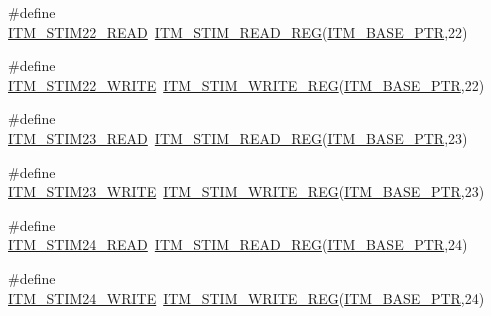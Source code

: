 \begin{DoxyCompactItemize}
\item 
\#define \hyperlink{group___i_t_m___register___accessor___macros_ga65cc639289ac0f598f937c573ed5abde}{I\+T\+M\+\_\+\+S\+T\+I\+M22\+\_\+\+R\+E\+AD}~\hyperlink{group___i_t_m___register___accessor___macros_ga5009882336aadcd4f37b45cf3395c450}{I\+T\+M\+\_\+\+S\+T\+I\+M\+\_\+\+R\+E\+A\+D\+\_\+\+R\+EG}(\hyperlink{group___i_t_m___peripheral_gafaddee8fe8b6a898d4e5edc43ee0d703}{I\+T\+M\+\_\+\+B\+A\+S\+E\+\_\+\+P\+TR},22)
\item 
\#define \hyperlink{group___i_t_m___register___accessor___macros_ga7733147e8939d83fbea163a3d3c181d4}{I\+T\+M\+\_\+\+S\+T\+I\+M22\+\_\+\+W\+R\+I\+TE}~\hyperlink{group___i_t_m___register___accessor___macros_ga049ca92a4e78e77c19af81e51aa73f1c}{I\+T\+M\+\_\+\+S\+T\+I\+M\+\_\+\+W\+R\+I\+T\+E\+\_\+\+R\+EG}(\hyperlink{group___i_t_m___peripheral_gafaddee8fe8b6a898d4e5edc43ee0d703}{I\+T\+M\+\_\+\+B\+A\+S\+E\+\_\+\+P\+TR},22)
\item 
\#define \hyperlink{group___i_t_m___register___accessor___macros_gaa2155b2b5a6c7d6a8a3cc643a4bd4af6}{I\+T\+M\+\_\+\+S\+T\+I\+M23\+\_\+\+R\+E\+AD}~\hyperlink{group___i_t_m___register___accessor___macros_ga5009882336aadcd4f37b45cf3395c450}{I\+T\+M\+\_\+\+S\+T\+I\+M\+\_\+\+R\+E\+A\+D\+\_\+\+R\+EG}(\hyperlink{group___i_t_m___peripheral_gafaddee8fe8b6a898d4e5edc43ee0d703}{I\+T\+M\+\_\+\+B\+A\+S\+E\+\_\+\+P\+TR},23)
\item 
\#define \hyperlink{group___i_t_m___register___accessor___macros_gaca71beb45d1448267f6f0f4ae952ce42}{I\+T\+M\+\_\+\+S\+T\+I\+M23\+\_\+\+W\+R\+I\+TE}~\hyperlink{group___i_t_m___register___accessor___macros_ga049ca92a4e78e77c19af81e51aa73f1c}{I\+T\+M\+\_\+\+S\+T\+I\+M\+\_\+\+W\+R\+I\+T\+E\+\_\+\+R\+EG}(\hyperlink{group___i_t_m___peripheral_gafaddee8fe8b6a898d4e5edc43ee0d703}{I\+T\+M\+\_\+\+B\+A\+S\+E\+\_\+\+P\+TR},23)
\item 
\#define \hyperlink{group___i_t_m___register___accessor___macros_ga114f7258f85d135f2e6e5f6bf2fff8a6}{I\+T\+M\+\_\+\+S\+T\+I\+M24\+\_\+\+R\+E\+AD}~\hyperlink{group___i_t_m___register___accessor___macros_ga5009882336aadcd4f37b45cf3395c450}{I\+T\+M\+\_\+\+S\+T\+I\+M\+\_\+\+R\+E\+A\+D\+\_\+\+R\+EG}(\hyperlink{group___i_t_m___peripheral_gafaddee8fe8b6a898d4e5edc43ee0d703}{I\+T\+M\+\_\+\+B\+A\+S\+E\+\_\+\+P\+TR},24)
\item 
\#define \hyperlink{group___i_t_m___register___accessor___macros_gaba2149ea4a29fd70514c8e637a6cedd9}{I\+T\+M\+\_\+\+S\+T\+I\+M24\+\_\+\+W\+R\+I\+TE}~\hyperlink{group___i_t_m___register___accessor___macros_ga049ca92a4e78e77c19af81e51aa73f1c}{I\+T\+M\+\_\+\+S\+T\+I\+M\+\_\+\+W\+R\+I\+T\+E\+\_\+\+R\+EG}(\hyperlink{group___i_t_m___peripheral_gafaddee8fe8b6a898d4e5edc43ee0d703}{I\+T\+M\+\_\+\+B\+A\+S\+E\+\_\+\+P\+TR},24)

\end{DoxyCompactItemize}

